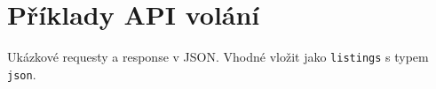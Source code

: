 \chapter{Příklady API volání}
\label{app:api-examples}

Ukázkové requesty a response v JSON. Vhodné vložit jako \texttt{listings} s typem \texttt{json}.
